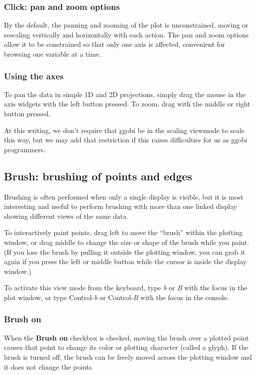 \documentclass[11pt]{article}
\begin{document}
\subsubsection{Click: pan and zoom options}

By the default, the panning and zooming of the plot is unconstrained,
moving or rescaling vertically and horizontally with each action.
The pan and zoom options allow it to be constrained so that only
one axis is affected, convenient for browsing one variable at a time.

\subsubsection{Using the axes}

To pan the data in simple 1D and 2D projections, simply drag the mouse
in the axis widgets with the left button pressed.  To zoom, drag with
the middle or right button pressed.

At this writing, we don't require that ggobi be in the scaling viewmode to
scale this way, but we may add that restriction if this raises 
difficulties for us as ggobi programmers.

\subsection{Brush: brushing of points and edges}
\label{slbl:Brush}

Brushing is often performed when only a single display is visible,
but it is most interesting and useful to perform brushing with more
than one linked display showing different views of the same data.  

To interactively paint points, drag left to move the ``brush'' within
the plotting window, or drag middle to change the size or shape of
the brush while you paint.  (If you lose the brush by pulling it
outside the plotting window, you can grab it again if you press the
left or middle button while the cursor is inside the display window.)

To activate this view mode from the keyboard, type {\em b} or {\em B}
with the focus in the plot window, or type Control-{\em b} or
Control-{\em B} with the focus in the console.

\subsubsection{Brush on}
%
When the {\bf Brush on} checkbox is checked, moving the brush
over a plotted point causes that point to change its color or
plotting character (called a glyph).  If the brush is turned off, the
brush can be freely moved across the plotting window and it does not
change the points.
\end{document}

